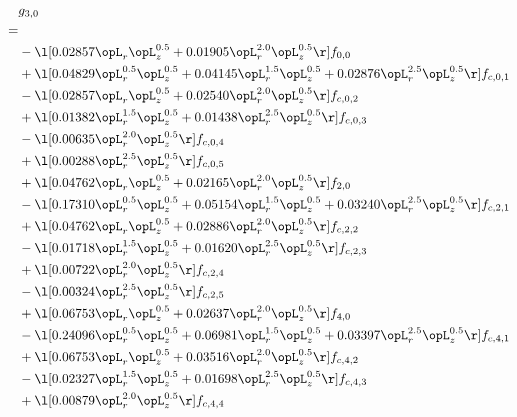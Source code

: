 \begin{alignat}{2} 
\label{eq:g_30_0} 
& g_{3,0} \nonumber \\ 
 = \\ 
& - \l[  0.02857 \opL_r \opL_z^{0.5} +  0.01905 \opL_r^{2.0} \opL_z^{0.5}  \r] f_{0,0} \nonumber \\ 
& + \l[  0.04829 \opL_r^{0.5} \opL_z^{0.5} +  0.04145 \opL_r^{1.5} \opL_z^{0.5} +  0.02876 \opL_r^{2.5} \opL_z^{0.5}  \r] f_{c,0,1} \nonumber \\ 
& - \l[  0.02857 \opL_r \opL_z^{0.5} +  0.02540 \opL_r^{2.0} \opL_z^{0.5}  \r] f_{c,0,2} \nonumber \\ 
& + \l[  0.01382 \opL_r^{1.5} \opL_z^{0.5} +  0.01438 \opL_r^{2.5} \opL_z^{0.5}  \r] f_{c,0,3} \nonumber \\ 
& - \l[  0.00635 \opL_r^{2.0} \opL_z^{0.5}  \r] f_{c,0,4} \nonumber \\ 
& + \l[  0.00288 \opL_r^{2.5} \opL_z^{0.5}  \r] f_{c,0,5} \nonumber \\ 
& + \l[  0.04762 \opL_r \opL_z^{0.5} +  0.02165 \opL_r^{2.0} \opL_z^{0.5}  \r] f_{2,0} \nonumber \\ 
& - \l[  0.17310 \opL_r^{0.5} \opL_z^{0.5} +  0.05154 \opL_r^{1.5} \opL_z^{0.5} +  0.03240 \opL_r^{2.5} \opL_z^{0.5}  \r] f_{c,2,1} \nonumber \\ 
& + \l[  0.04762 \opL_r \opL_z^{0.5} +  0.02886 \opL_r^{2.0} \opL_z^{0.5}  \r] f_{c,2,2} \nonumber \\ 
& - \l[  0.01718 \opL_r^{1.5} \opL_z^{0.5} +  0.01620 \opL_r^{2.5} \opL_z^{0.5}  \r] f_{c,2,3} \nonumber \\ 
& + \l[  0.00722 \opL_r^{2.0} \opL_z^{0.5}  \r] f_{c,2,4} \nonumber \\ 
& - \l[  0.00324 \opL_r^{2.5} \opL_z^{0.5}  \r] f_{c,2,5} \nonumber \\ 
& + \l[  0.06753 \opL_r \opL_z^{0.5} +  0.02637 \opL_r^{2.0} \opL_z^{0.5}  \r] f_{4,0} \nonumber \\ 
& - \l[  0.24096 \opL_r^{0.5} \opL_z^{0.5} +  0.06981 \opL_r^{1.5} \opL_z^{0.5} +  0.03397 \opL_r^{2.5} \opL_z^{0.5}  \r] f_{c,4,1} \nonumber \\ 
& + \l[  0.06753 \opL_r \opL_z^{0.5} +  0.03516 \opL_r^{2.0} \opL_z^{0.5}  \r] f_{c,4,2} \nonumber \\ 
& - \l[  0.02327 \opL_r^{1.5} \opL_z^{0.5} +  0.01698 \opL_r^{2.5} \opL_z^{0.5}  \r] f_{c,4,3} \nonumber \\ 
& + \l[  0.00879 \opL_r^{2.0} \opL_z^{0.5}  \r] f_{c,4,4} \nonumber \\ 

\end{alignat}

